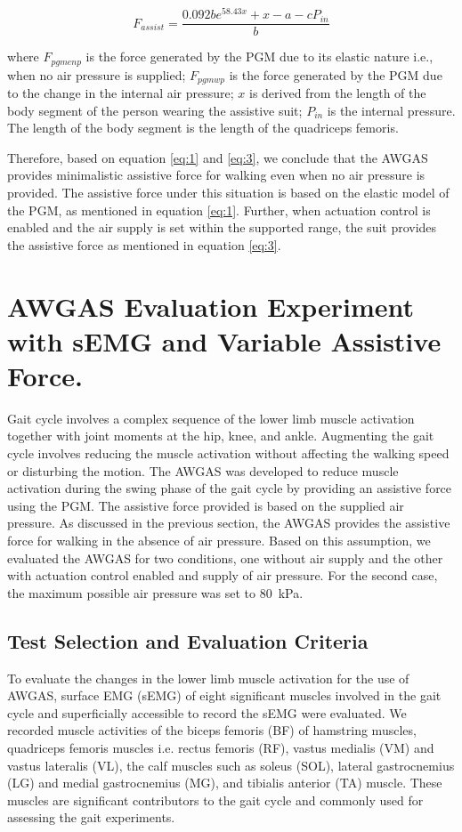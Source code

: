 \documentclass[paper,JRM,paper]{jaciiiarticle}
\begin{document}
\begin{equation}\label{eq:3}
F_{assist} =  \dfrac{0.092be^{58.43x} +x - a - cP_{in}}{b}
\end{equation}

where 
$F_{pgmenp}$ is the force generated by the PGM due to its elastic nature i.e., when no air pressure is supplied; 
$F_{pgmwp}$ is the force generated by the PGM due to the change in the internal air pressure;
$x$ is derived from the length of the body segment of the person wearing the assistive suit; $P_{in}$ is the internal pressure. The length of the body segment is the length of the quadriceps femoris. 

Therefore, based on equation \ref{eq:1} and \ref{eq:3}, we conclude that the AWGAS provides minimalistic assistive force for walking even when no air pressure is provided. The assistive force under this situation is based on the elastic model of the PGM, as mentioned in equation \ref{eq:1}. Further, when actuation control is enabled and the air supply is set within the supported range, the suit provides the assistive force as mentioned in equation \ref{eq:3}.

\section{AWGAS Evaluation Experiment with sEMG and Variable Assistive Force.}

Gait cycle involves a complex sequence of the lower limb muscle activation together with joint moments at the hip, knee, and ankle. Augmenting the gait cycle involves reducing the muscle activation without affecting the walking speed or disturbing the motion. The AWGAS was developed to reduce muscle activation during the swing phase of the gait cycle by providing an assistive force using the PGM. The assistive force provided is based on the supplied air pressure. As discussed in the previous section, the AWGAS provides the assistive force for walking in the absence of air pressure. Based on this assumption, we evaluated the AWGAS for two conditions, one without air supply and the other with actuation control enabled and supply of air pressure. For the second case, the maximum possible air pressure was set to \SI{80}{\kilo\pascal}.

\subsection{Test Selection and Evaluation Criteria}
To evaluate the changes in the lower limb muscle activation for the use of AWGAS, surface EMG (sEMG) of eight significant muscles involved in the gait cycle and superficially accessible to record the sEMG were evaluated. We recorded muscle activities of the biceps femoris (BF) of hamstring muscles, quadriceps femoris muscles i.e. rectus femoris (RF), vastus medialis (VM) and vastus lateralis (VL), the calf muscles such as soleus (SOL), lateral gastrocnemius (LG) and medial gastrocnemius (MG), and tibialis anterior (TA) muscle. These muscles are significant contributors to the gait cycle and commonly used for assessing the gait experiments. 
\end{document}
